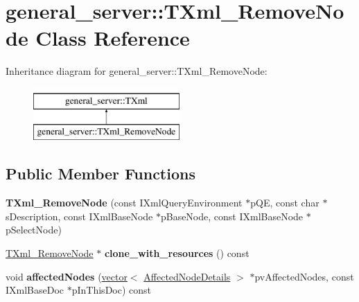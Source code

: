 \hypertarget{classgeneral__server_1_1TXml__RemoveNode}{\section{general\-\_\-server\-:\-:\-T\-Xml\-\_\-\-Remove\-Node \-Class \-Reference}
\label{classgeneral__server_1_1TXml__RemoveNode}
}
\-Inheritance diagram for general\-\_\-server\-:\-:\-T\-Xml\-\_\-\-Remove\-Node\-:\begin{figure}[H]
\begin{center}
\leavevmode
\includegraphics[height=2.000000cm]{classgeneral__server_1_1TXml__RemoveNode}
\end{center}
\end{figure}
\subsection*{\-Public \-Member \-Functions}
\begin{DoxyCompactItemize}
\item 
\hypertarget{classgeneral__server_1_1TXml__RemoveNode_a44b003836b3172a0bae74e756ad2e81b}{{\bfseries \-T\-Xml\-\_\-\-Remove\-Node} (const \-I\-Xml\-Query\-Environment $\ast$p\-Q\-E, const char $\ast$s\-Description, const \-I\-Xml\-Base\-Node $\ast$p\-Base\-Node, const \-I\-Xml\-Base\-Node $\ast$p\-Select\-Node)}\label{classgeneral__server_1_1TXml__RemoveNode_a44b003836b3172a0bae74e756ad2e81b}

\item 
\hypertarget{classgeneral__server_1_1TXml__RemoveNode_a9d0590654d53179e312af41ae6c1ffe8}{\hyperlink{classgeneral__server_1_1TXml__RemoveNode}{\-T\-Xml\-\_\-\-Remove\-Node} $\ast$ {\bfseries clone\-\_\-with\-\_\-resources} () const }\label{classgeneral__server_1_1TXml__RemoveNode_a9d0590654d53179e312af41ae6c1ffe8}

\item 
\hypertarget{classgeneral__server_1_1TXml__RemoveNode_a477af77f00134275c9b54a71531dc680}{void {\bfseries affected\-Nodes} (\hyperlink{classvector}{vector}$<$ \hyperlink{structgeneral__server_1_1TXml_1_1AffectedNodeDetails}{\-Affected\-Node\-Details} $>$ $\ast$pv\-Affected\-Nodes, const \-I\-Xml\-Base\-Doc $\ast$p\-In\-This\-Doc) const }\label{classgeneral__server_1_1TXml__RemoveNode_a477af77f00134275c9b54a71531dc680}

\end{DoxyCompactItemize}
